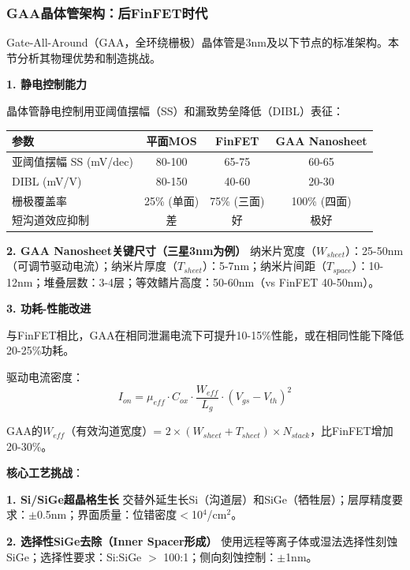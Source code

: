 \subsubsection{GAA晶体管架构：后FinFET时代}

Gate-All-Around（GAA，全环绕栅极）晶体管是3nm及以下节点的标准架构。本节分析其物理优势和制造挑战\cite{IEDM2024GAA, Samsung2024GAA, Intel2024RibbonFET}。

\textbf{1. 静电控制能力}

晶体管静电控制用亚阈值摆幅（SS）和漏致势垒降低（DIBL）表征：

\begin{table}[H]
\centering
\small
\begin{tabular}{lccc}
\toprule
\textbf{参数} & \textbf{平面MOS} & \textbf{FinFET} & \textbf{GAA Nanosheet} \\
\midrule
亚阈值摆幅 SS (mV/dec) & 80-100 & 65-75 & 60-65 \\
DIBL (mV/V) & 80-150 & 40-60 & 20-30 \\
栅极覆盖率 & 25\% (单面) & 75\% (三面) & 100\% (四面) \\
短沟道效应抑制 & 差 & 好 & 极好 \\
\bottomrule
\end{tabular}
\end{table}

\textbf{2. GAA Nanosheet关键尺寸（三星3nm为例）}
纳米片宽度（$W_{sheet}$）：25-50nm（可调节驱动电流）；纳米片厚度（$T_{sheet}$）：5-7nm；纳米片间距（$T_{space}$）：10-12nm；堆叠层数：3-4层；等效鳍片高度：50-60nm（vs FinFET 40-50nm）。

\textbf{3. 功耗-性能改进}

与FinFET相比，GAA在相同泄漏电流下可提升10-15\%性能，或在相同性能下降低20-25\%功耗。

驱动电流密度：
\begin{equation}
I_{on} = \mu_{eff} \cdot C_{ox} \cdot \frac{W_{eff}}{L_g} \cdot (V_{gs} - V_{th})^2
\end{equation}

GAA的$W_{eff}$（有效沟道宽度）= $2 \times (W_{sheet} + T_{sheet}) \times N_{stack}$，比FinFET增加20-30\%。

\textbf{核心工艺挑战}：

\textbf{1. Si/SiGe超晶格生长}
交替外延生长Si（沟道层）和SiGe（牺牲层）；层厚精度要求：$\pm$0.5nm；界面质量：位错密度$<$10$^4$/cm$^2$。

\textbf{2. 选择性SiGe去除（Inner Spacer形成）}
使用远程等离子体或湿法选择性刻蚀SiGe；选择性要求：Si:SiGe $>$ 100:1；侧向刻蚀控制：$\pm$1nm。


